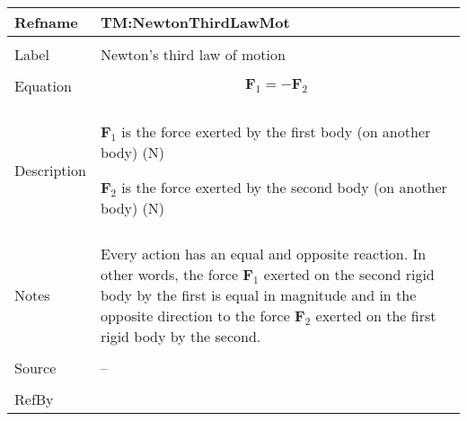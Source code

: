 \documentclass[12pt]{article}
\begin{document}
\noindent
\begin{minipage}{\textwidth}
\begin{tabular}{>{\raggedright}p{}>{\raggedright\arraybackslash}p{}}
\toprule \textbf{Refname} & \textbf{TM:NewtonThirdLawMot}
\label{TM:NewtonThirdLawMot}
\\ \midrule \\
Label & Newton's third law of motion
        
\\ \midrule \\
Equation & \begin{displaymath}
           {\symbf{F}_{1}}=-{\symbf{F}_{2}}
           \end{displaymath}
\\ \midrule \\
Description & \begin{symbDescription}
              \item{${\symbf{F}_{1}}$ is the force exerted by the first body (on another body) (${\text{N}}$)}
              \item{${\symbf{F}_{2}}$ is the force exerted by the second body (on another body) (${\text{N}}$)}
              \end{symbDescription}
\\ \midrule \\
Notes & Every action has an equal and opposite reaction. In other words, the force ${\symbf{F}_{1}}$ exerted on the second rigid body by the first is equal in magnitude and in the opposite direction to the force ${\symbf{F}_{2}}$ exerted on the first rigid body by the second.
        
\\ \midrule \\
Source & --
         
\\ \midrule \\
RefBy & 
\\ \bottomrule
\end{tabular}
\end{minipage}
\vspace{\baselineskip}
\noindent
\end{document}
